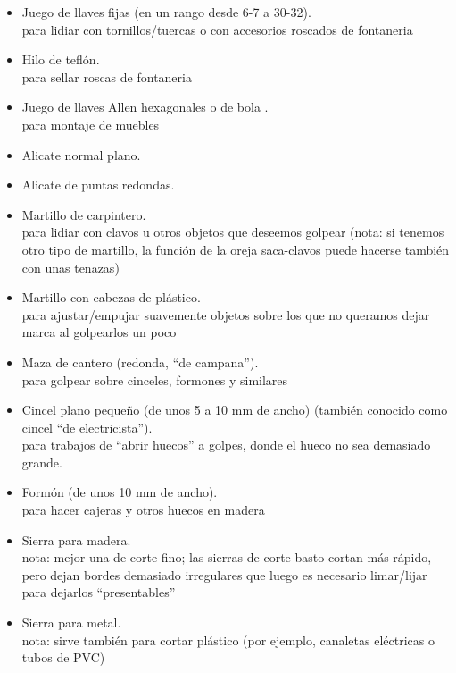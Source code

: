 \documentclass[spanish,10pt,a4paper,final,oneside]{article}
\begin{document}
\begin{itemize}
\item Juego de llaves fijas (en un rango desde 6-7 a 30-32).
\\para lidiar con tornillos/tuercas o con accesorios roscados de fontaneria

\item Hilo de teflón.
\\para sellar roscas de fontaneria

\item Juego de llaves Allen hexagonales o de bola .
\\para montaje de muebles

\item Alicate normal plano.

\item Alicate de puntas redondas.

\item Martillo de carpintero.
\\para lidiar con clavos u otros objetos que deseemos golpear (nota: si tenemos otro tipo de martillo, la función de la oreja saca-clavos puede hacerse también con unas tenazas)

\item Martillo con cabezas de plástico.
\\para ajustar/empujar suavemente objetos sobre los que no queramos dejar marca al golpearlos un poco

\item Maza de cantero (redonda, ``de campana'').
\\para golpear sobre cinceles, formones y similares

\item Cincel plano pequeño (de unos 5 a 10 mm de ancho) (también conocido como cincel ``de electricista'').
\\para trabajos de ``abrir huecos'' a golpes, donde el hueco no sea demasiado grande.

\item Formón (de unos 10 mm de ancho).
\\para hacer cajeras y otros huecos en madera

\item Sierra para madera.
\\nota: mejor una de corte fino; las sierras de corte basto cortan más rápido, pero dejan bordes demasiado irregulares que luego es necesario limar/lijar para dejarlos ``presentables''

\item Sierra para metal.
\\nota: sirve también para cortar plástico (por ejemplo, canaletas eléctricas o tubos de PVC) 


\end{itemize}
\end{document}

